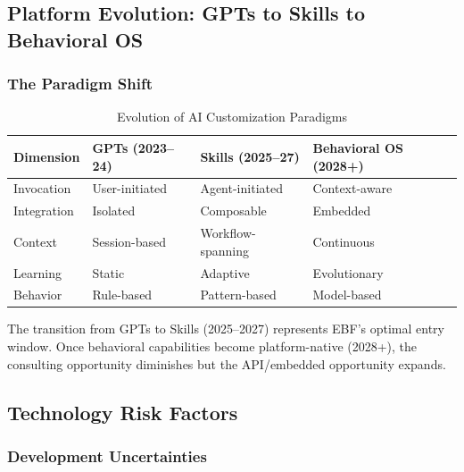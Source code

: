 \subsection{Platform Evolution: GPTs to Skills to Behavioral OS}

\subsubsection{The Paradigm Shift}

\begin{table}[htbp]
\centering
\caption{Evolution of AI Customization Paradigms}
\begin{tabular}{@{}p{2.5cm}p{3.5cm}p{3.5cm}p{3.5cm}@{}}
\toprule
\textbf{Dimension} & \textbf{GPTs (2023--24)} & \textbf{Skills (2025--27)} & \textbf{Behavioral OS (2028+)} \\
\midrule
Invocation & User-initiated & Agent-initiated & Context-aware \\
Integration & Isolated & Composable & Embedded \\
Context & Session-based & Workflow-spanning & Continuous \\
Learning & Static & Adaptive & Evolutionary \\
Behavior & Rule-based & Pattern-based & Model-based \\
\bottomrule
\end{tabular}
\end{table}

\begin{tcolorbox}[colback=green!5,colframe=green!50,title=Strategic Window]
The transition from GPTs to Skills (2025--2027) represents EBF's optimal
entry window. Once behavioral capabilities become platform-native (2028+),
the consulting opportunity diminishes but the API/embedded opportunity expands.
\end{tcolorbox}


\subsection{Technology Risk Factors}

\subsubsection{Development Uncertainties}

